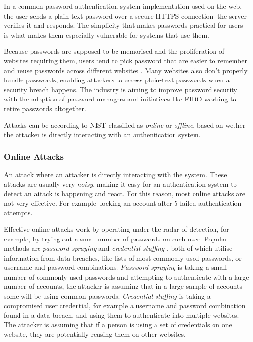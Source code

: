 In a common password authentication system implementation used on the web, the user sends a plain-text password over a secure HTTPS connection, the server verifies it and responds.
The simplicity that makes passwords practical for users is what makes them especially vulnerable for systems that use them.

Because passwords are supposed to be memorised and the proliferation of websites requiring them, users tend to pick password that are easier to remember and reuse passwords across different websites \cite{conklin2004password}.
Many websites also don't properly handle passwords, enabling attackers to access plain-text passwords when a security breach happens.
The industry is aiming to improve password security with the adoption of password managers and initiatives like FIDO \cite{balfanz2013fido} working to retire passwords altogether.

Attacks can be according to NIST \cite{grassi2017} classified as \textit{online} or \textit{offline}, based on wether the attacker is directly interacting with an authentication system.

\subsubsection{Online Attacks} An attack where an attacker is directly interacting with the system.
These attacks are usually very \textit{noisy}, making it easy for an authentication system to detect an attack is happening and react. For this reason, most online attacks are not very effective.
For example, locking an account after 5 failed authentication attempts.

Effective online attacks work by operating under the radar of detection, for example, by trying out a small number of passwords on each user.
Popular methods are \textit{password spraying} and \textit{credential stuffing} \cite{haber2020attack}, both of which utilise information from data breaches, like lists of most commonly used passwords, or username and password combinations.
\textit{Password spraying} is taking a small number of commonly used passwords and attempting to authenticate with a large number of accounts, the attacker is assuming that in a large sample of accounts some will be using common passwords.
\textit{Credential stuffing} is taking a compromised user credential, for example a username and password combination found in a data breach, and using them to authenticate into multiple websites. 
The attacker is assuming that if a person is using a set of credentials on one website, they are potentially reusing them on other websites.

